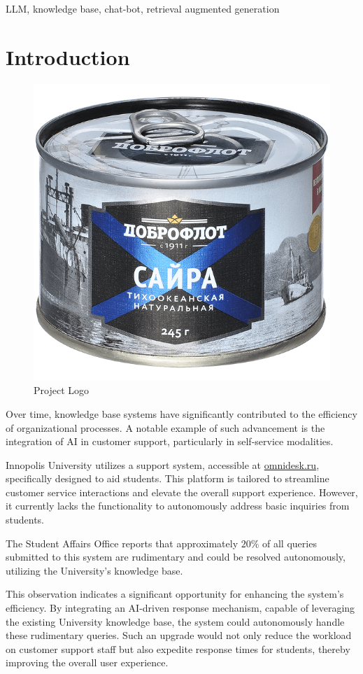 \documentclass[conference, 11pt]{IEEEtran}
\begin{document}
\begin{IEEEkeywords}
LLM, knowledge base, chat-bot, retrieval augmented generation
\end{IEEEkeywords}

\section{Introduction}

\begin{figure}[h]
\centering
\includegraphics[width=0.4\linewidth]{saira.png}
\caption{Project Logo}
\end{figure}

Over time, knowledge base systems have significantly contributed to the efficiency of organizational processes. A notable example of such advancement is the integration of AI in customer support, particularly in self-service modalities.

Innopolis University utilizes a support system, accessible at \href{http://omnidesk.ru}{omnidesk.ru}, specifically designed to aid students. This platform is tailored to streamline customer service interactions and elevate the overall support experience. However, it currently lacks the functionality to autonomously address basic inquiries from students.

The Student Affairs Office reports that approximately $20\%$ of all queries submitted to this system are rudimentary and could be resolved autonomously, utilizing the University's knowledge base.

This observation indicates a significant opportunity for enhancing the system's efficiency. By integrating an AI-driven response mechanism, capable of leveraging the existing University knowledge base, the system could autonomously handle these rudimentary queries. Such an upgrade would not only reduce the workload on customer support staff but also expedite response times for students, thereby improving the overall user experience.
\end{document}
